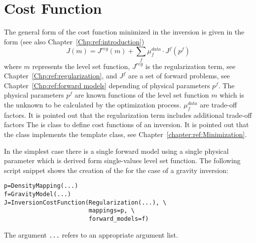 \chapter{Cost Function}\label{chapter:ref:inversion cost function}
The general form of the cost function minimized in the inversion is given in the form (see also Chapter~\ref{Chp:ref:introduction})
\begin{equation}\label{REF:EQU:DRIVE:10}
J(m) = J^{reg}(m) + \sum_{f} \mu^{data}_{f} \cdot J^{f}(p^f)
\end{equation} 
where $m$ represents the level set function, $J^{reg}$ is the regularization term, see Chapter~\ref{Chp:ref:regularization},
and $J^{f}$ are a set of forward problems, see Chapter~\ref{Chp:ref:forward models} depending of 
physical parameters $p^f$.  The physical parameters $p^f$ are known functions 
of the  level set function $m$ which is the unknown to be calculated by the optimization process. 
$\mu^{data}_{f}$ are trade-off factors. It is pointed out that the regularization term includes additional trade-off factors 
The  is class to define cost functions of an inversion. It is pointed out that
the  class implements the  template class, see Chapter~\ref{chapter:ref:Minimization}.

In the simplest case there is a single forward model using a single physical parameter which is 
derived form single-values level set function. The following script snippet shows the creation of the
 for the case of a gravity inversion:
\begin{verbatim}
p=DensityMapping(...)
f=GravityModel(...)
J=InversionCostFunction(Regularization(...), \
                        mappings=p, \
                        forward_models=f)
\end{verbatim}
The argument \verb|...| refers to an appropriate argument list.

